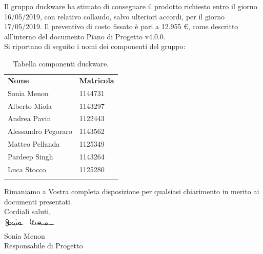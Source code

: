 \documentclass[a4paper,12pt]{article}
\begin{document}
Il gruppo duckware ha stimato di consegnare il prodotto richiesto entro il giorno 16/05/2019, con relativo collaudo, salvo ulteriori accordi, per il giorno 17/05/2019. Il preventivo di costo fissato è pari a 12.955 \euro, come descritto all’interno del documento Piano di Progetto v4.0.0.\\[0.5cm]
Si riportano di seguito i nomi dei componenti del gruppo:
\begin{center}
	\renewcommand{\arraystretch}{1.5}
	\begin{longtable}{  p{4cm}  p{2cm}  }
		\rowcolor{tableHeadYellow}
		\textbf{Nome}   & \textbf{Matricola} \\
		Sonia Menon & 1144731\\
		Alberto Miola & 1143297\\
		Andrea Pavin & 1122443\\
		Alessandro Pegoraro & 1143562\\
		Matteo Pellanda & 1125349\\
		Pardeep Singh & 1143264\\
		Luca Stocco & 1125280\\
		\rowcolor{white}
		\caption{Tabella componenti duckware.}
	\end{longtable}
\end{center}
Rimaniamo a Vostra completa disposizione per qualsiasi chiarimento in merito ai documenti presentati.\\[1.5cm]
Cordiali saluti,\\
\includegraphics[width=0.2\textwidth]{../images/firme/firma_sonia.png}\\
Sonia Menon\\
Responsabile di Progetto
\vfill
\end{document}

